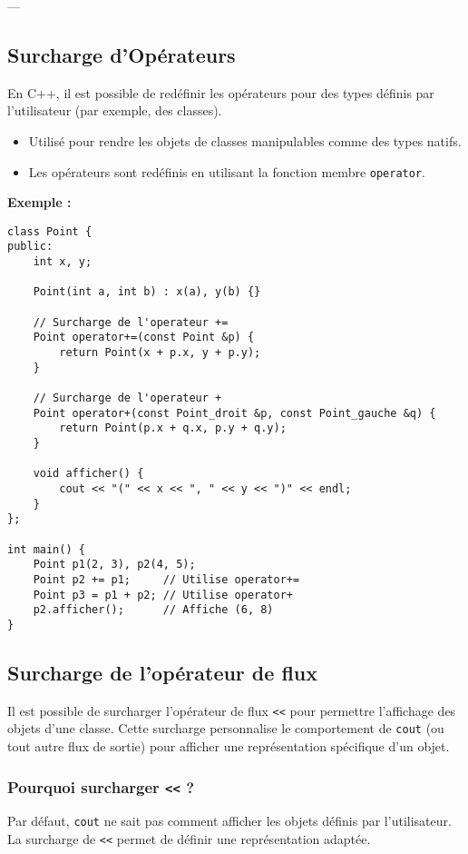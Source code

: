 ---

\subsection{ Surcharge d'Opérateurs}
En C++, il est possible de redéfinir les opérateurs pour des types définis par l'utilisateur (par exemple, des classes).
\begin{itemize}
    \item Utilisé pour rendre les objets de classes manipulables comme des types natifs.
    \item Les opérateurs sont redéfinis en utilisant la fonction membre \texttt{operator}.
\end{itemize}

\textbf{Exemple :}
\begin{tcolorbox}[colframe=blue!50!black, colback=blue!5!white, title=Exemple de Surcharge d'Opérateurs]
\begin{verbatim}
class Point {
public:
    int x, y;

    Point(int a, int b) : x(a), y(b) {}

    // Surcharge de l'operateur +=
    Point operator+=(const Point &p) {
        return Point(x + p.x, y + p.y);
    }

    // Surcharge de l'operateur +
    Point operator+(const Point_droit &p, const Point_gauche &q) {
        return Point(p.x + q.x, p.y + q.y);
    }

    void afficher() {
        cout << "(" << x << ", " << y << ")" << endl;
    }
};

int main() {
    Point p1(2, 3), p2(4, 5);
    Point p2 += p1;     // Utilise operator+=
    Point p3 = p1 + p2; // Utilise operator+
    p2.afficher();      // Affiche (6, 8)
}
\end{verbatim}
\end{tcolorbox}

\subsection{ Surcharge de l'opérateur de flux}
Il est possible de surcharger l'opérateur de flux \texttt{<<} pour permettre l'affichage des objets d'une classe. Cette surcharge personnalise le comportement de \texttt{cout} (ou tout autre flux de sortie) pour afficher une représentation spécifique d'un objet.

\subsubsection{ Pourquoi surcharger \texttt{<<} ?}
Par défaut, \texttt{cout} ne sait pas comment afficher les objets définis par l'utilisateur. La surcharge de \texttt{<<} permet de définir une représentation adaptée.

